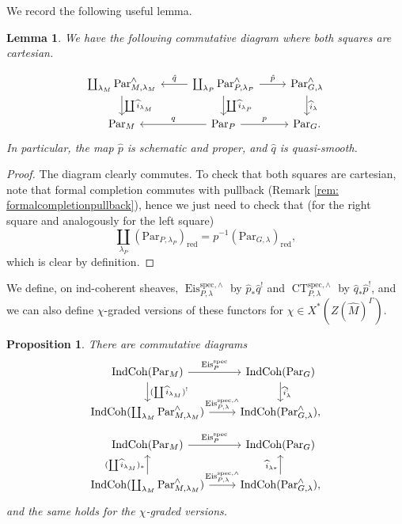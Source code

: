 \documentclass{amsart}
\newtheorem{lemma}[theorem]{Lemma}
\newtheorem{proposition}[theorem]{Proposition}
\theoremstyle{definition}
\theoremstyle{remark}
\numberwithin{equation}{section}
\newcommand{\spec}{\mathrm{spec}}
\newcommand{\wh}{\widehat}
\newcommand{\Par}{\mathrm{Par}}
\newcommand{\IndCoh}{\mathrm{IndCoh}}
\DeclareMathOperator{\Eis}{\mathrm{Eis}}
\DeclareMathOperator{\CT}{\mathrm{CT}}
\newcommand{\red}{\mathrm{red}}
\begin{document}
We record the following useful lemma.
\begin{lemma}{\label{lem: cartesianEisdiagram}}
    We have the following commutative diagram where both squares are cartesian.

\begin{equation*}
    \begin{tikzcd}
        \coprod_{\lambda_M} \Par^{\wedge}_{M, \lambda_M} \arrow[d, " \coprod\wh{i}_{\lambda_M}"]& \coprod_{\lambda_{P}} \Par^{\wedge}_{P, \lambda_{P}} \arrow[l, swap, "\hat{q}"] \arrow[r, "\hat{p}"] \arrow[d, "\coprod \wh{i}_{\lambda_{P}}"] & \Par^{\wedge}_{G, \lambda} \arrow[d, "\wh{i}_{\lambda}"] \\
        \Par_M & \Par_{P} \arrow[l, swap, "q"] \arrow[r, "p"] & \Par_G.
    \end{tikzcd}
\end{equation*} 
In particular, the map $\hat{p}$ is schematic and proper, and $\hat{q}$ is quasi-smooth. 
\end{lemma}

\begin{proof}
The diagram clearly commutes. To check that both squares are cartesian, note that formal completion commutes with pullback (Remark \ref{rem: formalcompletionpullback}), hence we just need to check that (for the right square and analogously for the left square) 
\begin{equation*}
    \coprod_{\lambda_P} (\Par_{P, \lambda_P})_{\red} = p^{-1}( \Par_{G, \lambda})_{\red},
\end{equation*}
which is clear by definition.
\end{proof}

We define, on ind-coherent sheaves, $\Eis^{\spec, \wedge}_{P, \lambda}$ by $\hat{p}_{\ast}\hat{q}^!$ and $\CT^{\spec, \wedge}_{P, \lambda}$ by $\hat{q}_{\ast} \hat{p}^!$, and we can also define $\chi$-graded versions of these functors for $\chi \in X^*(Z(\wh{M})^{\Gamma})$. 

\begin{proposition}\label{prop: EisComparisonCompletedFiber}
There are commutative diagrams
\[
    \begin{tikzcd}
        \IndCoh(\Par_M) \arrow[d, "(\coprod\wh{i}_{\lambda_M})^!"] \arrow[r, "\Eis_P^\spec"] & \IndCoh(\Par_G) \arrow[d, "\wh{i}_\lambda^!"] \\    
        \IndCoh (\coprod_{\lambda_M} \Par^{\wedge}_{M, \lambda_M}) \arrow[r, "\Eis_{P, \lambda}^{\spec,\wedge}"]  & \IndCoh(\Par^{\wedge}_{G, \lambda}), 
    \end{tikzcd}
\]
\[
      \begin{tikzcd}
        \IndCoh(\Par_M)  \arrow[r, "\Eis_P^\spec"] & \IndCoh(\Par_G)  \\    
        \IndCoh (\coprod_{\lambda_M} \Par^{\wedge}_{M, \lambda_M}) \arrow[u, "(\coprod\wh{i}_{\lambda_M})_*"] \arrow[r, "\Eis_{P, \lambda}^{\spec,\wedge}"]  & \IndCoh(\Par^{\wedge}_{G, \lambda}) \arrow[u, "\wh{i}_{\lambda*}"],
    \end{tikzcd}
\]
and the same holds for the $\chi$-graded versions.    
\end{proposition}
\end{document}
